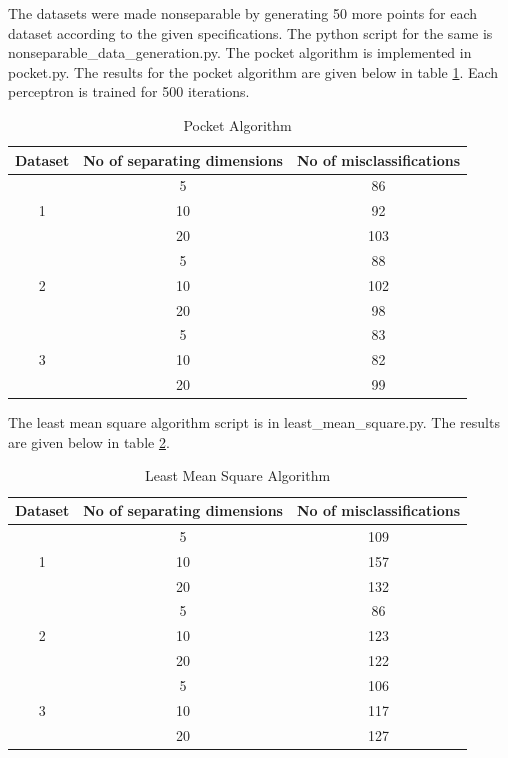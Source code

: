 \documentclass[12pt]{article}
\begin{document}
The datasets were made nonseparable by generating 50 more points for each dataset according to the given specifications. The python script for the same is nonseparable\_data\_generation.py. The pocket algorithm is implemented in pocket.py. The results for the pocket algorithm are given below in table \ref{tab:pocket}. Each perceptron is trained for 500 iterations.

\begin{table}[H]
  \centering
  \caption{Pocket Algorithm}
  \label{tab:pocket}
  \begin{tabular}{c|c|c}
    Dataset & No of separating dimensions & No of misclassifications \\
    \hline
    \multirow{3}{*}{1} & 5 & 86\\
    & 10 & 92\\
    & 20 & 103\\
    \hline
    \multirow{3}{*}{2} & 5 & 88\\
    & 10 & 102\\
    & 20 & 98\\
    \hline
    \multirow{3}{*}{3} & 5 & 83\\
    & 10 & 82\\
    & 20 & 99\\
  \end{tabular}
\end{table}

The least mean square algorithm script is in least\_mean\_square.py. The results are given below in table \ref{tab:least_mean_square}.

\begin{table}[H]
  \centering
  \caption{Least Mean Square Algorithm}
  \label{tab:least_mean_square}
  \begin{tabular}{c|c|c}
    Dataset & No of separating dimensions & No of misclassifications \\
    \hline
    \multirow{3}{*}{1} & 5 & 109\\
    & 10 & 157\\
    & 20 & 132\\
    \hline
    \multirow{3}{*}{2} & 5 & 86\\
    & 10 & 123\\
    & 20 & 122\\
    \hline
    \multirow{3}{*}{3} & 5 & 106\\
    & 10 & 117\\
    & 20 & 127\\
  \end{tabular}
\end{table}
\end{document}
